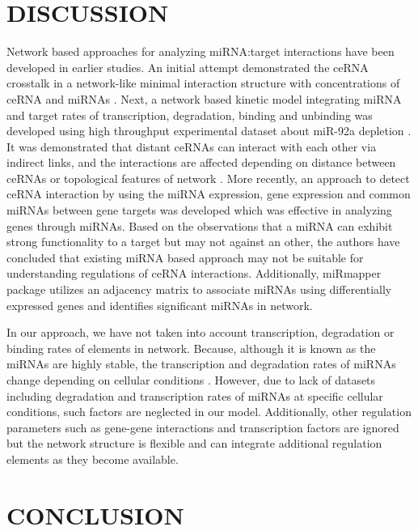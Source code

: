 \documentclass[a4,center,fleqn]{NAR}
\begin{document}
\section{DISCUSSION}

Network based approaches for analyzing miRNA:target interactions have
been developed in earlier studies. An initial attempt demonstrated the
ceRNA crosstalk in a network-like minimal interaction structure with
concentrations of ceRNA and miRNAs \citep{figliuzzi_micrornas_2013}.
Next, a network based kinetic model integrating miRNA and target rates
of transcription, degradation, binding and unbinding was developed
\citep{nitzan_interactions_2014} using high throughput experimental
dataset about miR-92a depletion \citep{helwak_mapping_2013}. It was
demonstrated that distant ceRNAs can interact with each other via
indirect links, and the interactions are affected depending on distance
between ceRNAs or topological features of network
\citep{nitzan_interactions_2014}. More recently, an approach to detect
ceRNA interaction by using the miRNA expression, gene expression and
common miRNAs between gene targets was developed
\citep{markus_list_sponge_2017} which was effective in analyzing genes
through miRNAs. Based on the observations that a miRNA can exhibit
strong functionality to a target but may not against an other, the
authors have concluded that existing miRNA based approach may not be
suitable for understanding regulations of ceRNA interactions.
Additionally, miRmapper package \citep{da2018mirmapper} utilizes an
adjacency matrix to associate miRNAs using differentially expressed
genes and identifies significant miRNAs in network.

In our approach, we have not taken into account transcription,
degradation or binding rates of elements in network. Because, although
it is known as the miRNAs are highly stable, the transcription and
degradation rates of miRNAs change depending on cellular conditions
\citep{ruegger_microrna_2012}. However, due to lack of datasets
including degradation and transcription rates of miRNAs at specific
cellular conditions, such factors are neglected in our model.
Additionally, other regulation parameters such as gene-gene interactions
and transcription factors are ignored but the network structure is
flexible and can integrate additional regulation elements as they become
available.

\section{CONCLUSION}
\end{document}
